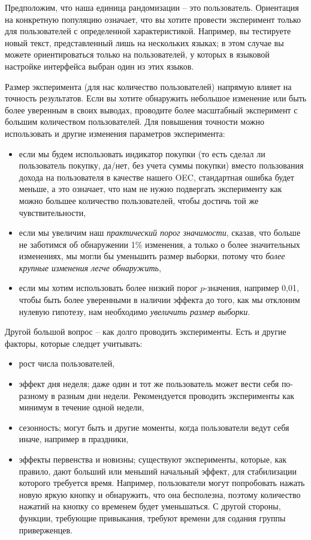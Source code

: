 \documentclass[%
	11pt,
	a4paper,
	utf8,
		]{article}
\begin{document}
Предположим, что наша единица рандомизации -- это пользователь. Ориентация на конкретную популяцию означает, что вы хотите провести эксперимент только для пользователей с определенной характеристикой. Например, вы тестируете новый текст, представленный лишь на нескольких языках; в этом случае вы можете ориентироваться только на пользователей, у которых в языковой настройке интерфейса выбран один из этих языков.

Размер эксперимента (для нас количество пользователей) напрямую влияет на точность результатов. Если вы хотите обнаружить небольшое изменение или быть более уверенным в своих выводах, проводите более масштабный эксперимент с большим количеством пользователей. Для повышения точности можно использовать и другие изменения параметров эксперимента:
\begin{itemize}
	\item если мы будем использовать индикатор покупки (то есть сделал ли пользователь покупку, да/нет, без учета суммы покупки) вместо пользования дохода на пользователя в качестве нашего OEC, стандартная ошибка будет меньше, а это означает, что нам не нужно подвергать эксперименту как можно большее количество пользователей, чтобы достичь той же чувствительности,
	
	\item если мы увеличим наш \emph{практический порог значимости}, сказав, что больше не заботимся об обнаружении 1\% изменения, а только о более значительных изменениях, мы могли бы уменьшить размер выборки, потому что \emph{более крупные изменения легче обнаружить},
	
	\item если мы хотим использовать более низкий порог $p$-значения, например 0,01, чтобы быть более уверенными в наличии эффекта до того, как мы отклоним нулевую гипотезу, нам необходимо \emph{\color{red}увеличить размер выборки}.
\end{itemize}

Другой большой вопрос -- как долго проводить эксперименты. Есть и другие факторы, которые следцет учитывать:
\begin{itemize}
	\item рост числа пользователей,
	
	\item эффект дня неделя; даже один и тот же пользователь может вести себя по-разному в разным дни недели. Рекомендуется проводить эксперименты как минимум в течение одной недели,
	
	\item сезонность; могут быть и другие моменты, когда пользователи ведут себя иначе, например в праздники,
	
	\item эффекты первенства и новизны; существуют эксперименты, которые, как правило, дают больший или меньший начальный эффект, для стабилизации которого требуется время. Например, пользователи могут попробовать нажать новую яркую кнопку и обнаружить, что она бесполезна, поэтому количество нажатий на кнопку со временем будет уменьшаться. С другой стороны, функции, требующие привыкания, требуют времени для содания группы приверженцев.
\end{itemize}
\end{document}
